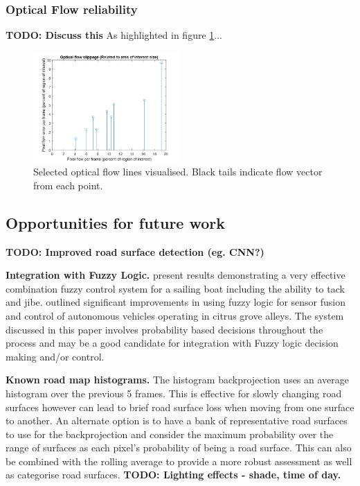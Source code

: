 \documentclass[]{aiaa-tc}%
\begin{document}
\subsubsection{Optical Flow reliability}


\textbf{TODO: Discuss this}
As highlighted in figure \ref{f:opticalFlowResults}...
\begin{figure} %
	\centering
	\includegraphics[width=0.5\textwidth]{Results/opticalFlowResults.png}
	\caption{Selected optical flow lines visualised. Black tails indicate flow vector from each point.}
	\label{f:opticalFlowResults}
\end{figure}


\subsection{Opportunities for future work} \label{s:improvements}

\textbf{TODO: Improved road surface detection (eg. CNN?)}

\textbf{Integration with Fuzzy Logic.} \citet{fuzzySail} present results demonstrating a very effective combination fuzzy control system for a sailing boat including the ability to tack and jibe. \citet{fuzzyGrove} outlined significant improvements in using fuzzy logic for sensor fusion and control of autonomous vehicles operating in citrus grove alleys. The system discussed in this paper involves probability based decisions throughout the process and may be a good candidate for integration with Fuzzy logic decision making and/or control.

\textbf{Known road map histograms.} The histogram backprojection uses an average histogram over the previous 5 frames. This is effective for slowly changing road surfaces however can lead to brief road surface loss when moving from one surface to another. An alternate option is to have a bank of representative road surfaces to use for the backprojection and consider the maximum probability over the range of surfaces as each pixel's probability of being a road surface. This can also be combined with the rolling average to provide a more robust assessment as well as categorise road surfaces. \textbf{TODO: Lighting effects - shade, time of day.}
\end{document}
